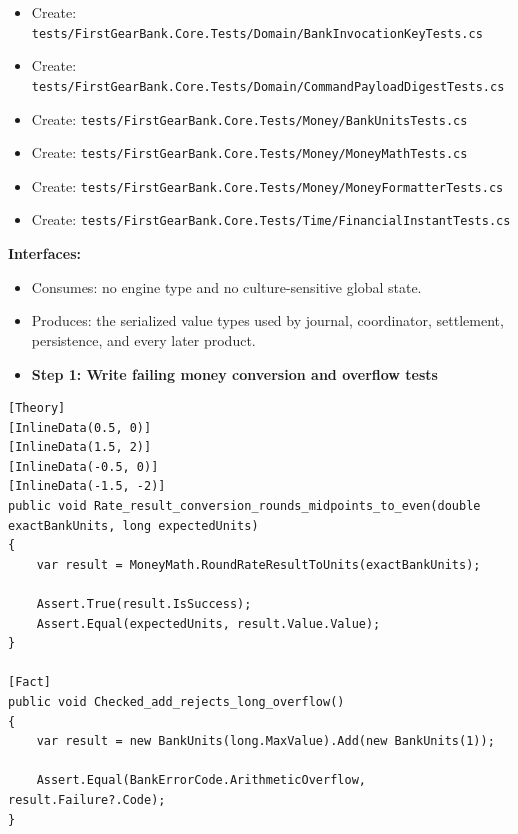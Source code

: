 \documentclass[
  10pt,
  letterpaper,
]{article}
\providecommand{\tightlist}{%
  \setlength{\itemsep}{0pt}\setlength{\parskip}{0pt}}
\begin{document}
\begin{itemize}
\item
  Create:
  \texttt{tests/}\allowbreak{}\texttt{FirstGearBank.}\allowbreak{}\texttt{Core.}\allowbreak{}\texttt{Tests/}\allowbreak{}\texttt{Domain/}\allowbreak{}\texttt{BankInvocationKeyTests.}\allowbreak{}\texttt{cs}
\item
  Create:
  \texttt{tests/}\allowbreak{}\texttt{FirstGearBank.}\allowbreak{}\texttt{Core.}\allowbreak{}\texttt{Tests/}\allowbreak{}\texttt{Domain/}\allowbreak{}\texttt{CommandPayloadDigestTests.}\allowbreak{}\texttt{cs}
\item
  Create:
  \texttt{tests/}\allowbreak{}\texttt{FirstGearBank.}\allowbreak{}\texttt{Core.}\allowbreak{}\texttt{Tests/}\allowbreak{}\texttt{Money/}\allowbreak{}\texttt{BankUnitsTests.}\allowbreak{}\texttt{cs}
\item
  Create:
  \texttt{tests/}\allowbreak{}\texttt{FirstGearBank.}\allowbreak{}\texttt{Core.}\allowbreak{}\texttt{Tests/}\allowbreak{}\texttt{Money/}\allowbreak{}\texttt{MoneyMathTests.}\allowbreak{}\texttt{cs}
\item
  Create:
  \texttt{tests/}\allowbreak{}\texttt{FirstGearBank.}\allowbreak{}\texttt{Core.}\allowbreak{}\texttt{Tests/}\allowbreak{}\texttt{Money/}\allowbreak{}\texttt{MoneyFormatterTests.}\allowbreak{}\texttt{cs}
\item
  Create:
  \texttt{tests/}\allowbreak{}\texttt{FirstGearBank.}\allowbreak{}\texttt{Core.}\allowbreak{}\texttt{Tests/}\allowbreak{}\texttt{Time/}\allowbreak{}\texttt{FinancialInstantTests.}\allowbreak{}\texttt{cs}
\end{itemize}

\textbf{Interfaces:}

\begin{itemize}
\tightlist
\item
  Consumes: no engine type and no culture-sensitive global state.
\item
  Produces: the serialized value types used by journal, coordinator,
  settlement, persistence, and every later product.
\end{itemize}

\begin{itemize}
\tightlist
\item[$\square$]
  \textbf{Step 1: Write failing money conversion and overflow tests}
\end{itemize}

\begin{lstlisting}
[Theory]
[InlineData(0.5, 0)]
[InlineData(1.5, 2)]
[InlineData(-0.5, 0)]
[InlineData(-1.5, -2)]
public void Rate_result_conversion_rounds_midpoints_to_even(double exactBankUnits, long expectedUnits)
{
    var result = MoneyMath.RoundRateResultToUnits(exactBankUnits);

    Assert.True(result.IsSuccess);
    Assert.Equal(expectedUnits, result.Value.Value);
}

[Fact]
public void Checked_add_rejects_long_overflow()
{
    var result = new BankUnits(long.MaxValue).Add(new BankUnits(1));

    Assert.Equal(BankErrorCode.ArithmeticOverflow, result.Failure?.Code);
}
\end{lstlisting}
\end{document}
